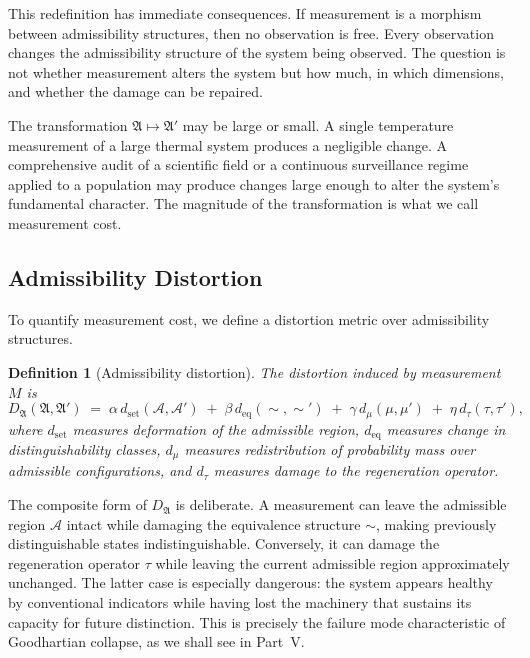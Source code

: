 \documentclass[12pt, a4paper]{article}
\theoremstyle{flyxion}
\newtheorem{definition}{Definition}
\newcommand{\fA}{\mathfrak{A}}
\newcommand{\cA}{\mathcal{A}}
\newcommand{\DA}{D_{\fA}}
\begin{document}
This redefinition has immediate consequences. If measurement is a morphism between admissibility structures, then no observation is free. Every observation changes the admissibility structure of the system being observed. The question is not whether measurement alters the system but how much, in which dimensions, and whether the damage can be repaired.

The transformation $\fA \mapsto \fA'$ may be large or small. A single temperature measurement of a large thermal system produces a negligible change. A comprehensive audit of a scientific field or a continuous surveillance regime applied to a population may produce changes large enough to alter the system's fundamental character. The magnitude of the transformation is what we call measurement cost.

\subsection*{Admissibility Distortion}

To quantify measurement cost, we define a distortion metric over admissibility structures.

\begin{definition}[Admissibility distortion]
The distortion induced by measurement $M$ is
\[
  \DA(\fA,\fA') \;=\;
  \alpha\, d_{\mathrm{set}}(\cA,\cA')
  \;+\;
  \beta\, d_{\mathrm{eq}}({\sim},{\sim}')
  \;+\;
  \gamma\, d_{\mu}(\mu,\mu')
  \;+\;
  \eta\, d_{\tau}(\tau,\tau'),
\]
where $d_{\mathrm{set}}$ measures deformation of the admissible region, $d_{\mathrm{eq}}$ measures change in distinguishability classes, $d_\mu$ measures redistribution of probability mass over admissible configurations, and $d_\tau$ measures damage to the regeneration operator.
\end{definition}

The composite form of $\DA$ is deliberate. A measurement can leave the admissible region $\cA$ intact while damaging the equivalence structure ${\sim}$, making previously distinguishable states indistinguishable. Conversely, it can damage the regeneration operator $\tau$ while leaving the current admissible region approximately unchanged. The latter case is especially dangerous: the system appears healthy by conventional indicators while having lost the machinery that sustains its capacity for future distinction. This is precisely the failure mode characteristic of Goodhartian collapse, as we shall see in Part~V.

\end{document}
